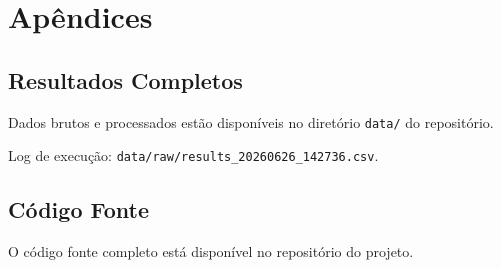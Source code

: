 \section{Apêndices}

\subsection{Resultados Completos}

Dados brutos e processados estão disponíveis no diretório \texttt{data/} do repositório.\par
Log de execução: \texttt{data/raw/results\_20260626\_142736.csv}.

\subsection{Código Fonte}

O código fonte completo está disponível no repositório do projeto.
